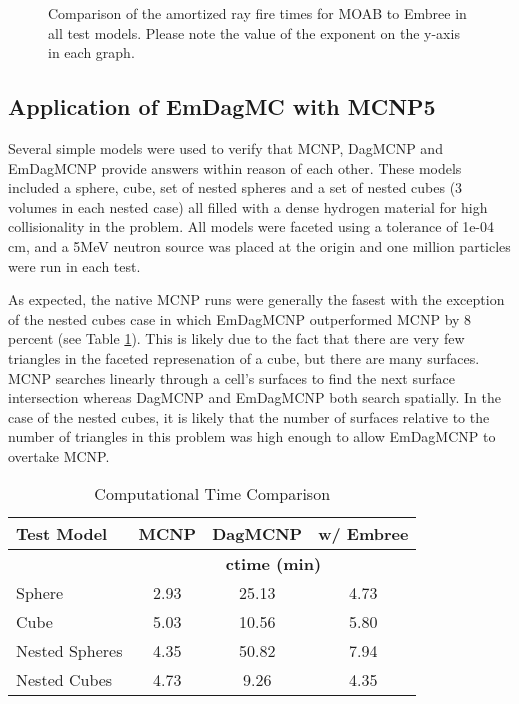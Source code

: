 \documentclass{anstrans}
\begin{document}
\begin{figure}[H]

  \begin{center}
    
    \caption{Comparison of the amortized ray fire times for MOAB to Embree in all test models. Please note the value of the exponent on the y-axis in each graph.}
    
  \end{center}

\end{figure}

\subsection{Application of EmDagMC with MCNP5}

Several simple models were used to verify that MCNP, DagMCNP and EmDagMCNP provide answers within reason of each other. These models included a sphere, cube, set of nested spheres and a set of nested cubes (3 volumes in each nested case) all filled with a dense hydrogen material for high collisionality in the problem. All models were faceted using a tolerance of 1e-04 cm, and a 5MeV neutron source was placed at the origin and one million particles were run in each test.

As expected, the native MCNP runs were generally the fasest with the exception of the nested cubes case in which EmDagMCNP outperformed MCNP by 8 percent (see Table \ref{timings}). This is likely due to the fact that there are very few triangles in the faceted represenation of a cube, but there are many surfaces. MCNP searches linearly through a cell's surfaces to find the next surface intersection whereas DagMCNP and EmDagMCNP both search spatially. In the case of the nested cubes, it is likely that the number of surfaces relative to the number of triangles in this problem was high enough to allow EmDagMCNP to overtake MCNP.

\begin{table}[h]

  \begin{center}

      \caption{Computational Time Comparison}
      \label{timings}
    \begin{tabular}{lccc}



      \toprule
      Test Model & MCNP & DagMCNP & w/ Embree \\
      \hline
      &  \multicolumn{3}{c}{\textbf{ctime (min)}} \\
      \hline
      Sphere & 2.93 & 25.13 & 4.73  \\
      Cube & 5.03 & 10.56  & 5.80 \\
      Nested Spheres & 4.35 & 50.82 & 7.94 \\
      Nested Cubes & 4.73 & 9.26 & 4.35 \\
      \bottomrule
      
    \end{tabular}
  \end{center}
  \end{table}
\end{document}
